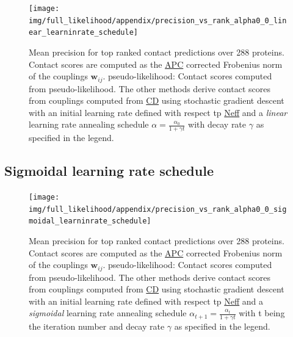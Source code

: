 \documentclass[12pt,a4paper,twoside]{book}
\newcommand{\wij}{\mathbf{w}_{ij}}
\theoremstyle{definition}
\theoremstyle{definition}
\theoremstyle{remark}
\begin{document}
\begin{figure}

{\centering \texttt{[image: img/full\_likelihood/appendix/precision\_vs\_rank\_alpha0\_0\_linear\_learninrate\_schedule]} 

}

\caption{Mean precision for top ranked
contact predictions over 288 proteins. Contact scores are computed as
the \protect\hyperlink{abbrev}{APC} corrected Frobenius norm of the
couplings \(\wij\). pseudo-likelihood: Contact scores computed from
pseudo-likelihood. The other methods derive contact scores from
couplings computed from \protect\hyperlink{abbrev}{CD} using stochastic
gradient descent with an initial learning rate defined with respect tp
\protect\hyperlink{abbrev}{Neff} and a \emph{linear} learning rate
annealing schedule \(\alpha = \frac{\alpha_0}{1 + \gamma t}\) with decay
rate \(\gamma\) as specified in the legend.}\label{fig:performance-cd-linschedule}
\end{figure}

\subsection{Sigmoidal learning rate
schedule}\label{sigmoidal-learning-rate-schedule}













\begin{figure}

{\centering \texttt{[image: img/full\_likelihood/appendix/precision\_vs\_rank\_alpha0\_0\_sigmoidal\_learninrate\_schedule]} 

}

\caption{Mean precision for top ranked
contact predictions over 288 proteins. Contact scores are computed as
the \protect\hyperlink{abbrev}{APC} corrected Frobenius norm of the
couplings \(\wij\). pseudo-likelihood: Contact scores computed from
pseudo-likelihood. The other methods derive contact scores from
couplings computed from \protect\hyperlink{abbrev}{CD} using stochastic
gradient descent with an initial learning rate defined with respect tp
\protect\hyperlink{abbrev}{Neff} and a \emph{sigmoidal} learning rate
annealing schedule \(\alpha_{t+1} = \frac{\alpha_{t}}{1 + \gamma t}\)
with t being the iteration number and decay rate \(\gamma\) as specified
in the legend.}\label{fig:performance-cd-sigschedule}
\end{figure}
\end{document}
